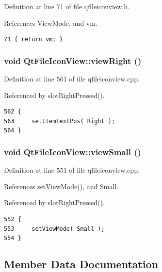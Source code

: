 Definition at line 71 of file qfileiconview.h.

References View\-Mode, and vm.



\footnotesize\begin{verbatim}71 { return vm; }
\end{verbatim}\normalsize 
{}
\subsubsection{\setlength{\rightskip}{0pt plus 5cm}void Qt\-File\-Icon\-View::view\-Right ()\hspace{0.3cm}{\tt  [protected, slot]}}\label{classQtFileIconView_QtFileIconViewj6}




Definition at line 561 of file qfileiconview.cpp.

Referenced by slot\-Right\-Pressed().



\footnotesize\begin{verbatim}562 {
563     setItemTextPos( Right );
564 }
\end{verbatim}\normalsize 
{}
\subsubsection{\setlength{\rightskip}{0pt plus 5cm}void Qt\-File\-Icon\-View::view\-Small ()\hspace{0.3cm}{\tt  [protected, slot]}}\label{classQtFileIconView_QtFileIconViewj4}




Definition at line 551 of file qfileiconview.cpp.

References set\-View\-Mode(), and Small.

Referenced by slot\-Right\-Pressed().



\footnotesize\begin{verbatim}552 {
553     setViewMode( Small );
554 }
\end{verbatim}\normalsize 


\subsection{Member Data Documentation}
